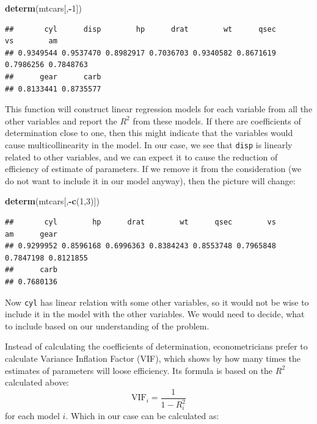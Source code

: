 \documentclass[
]{book}
\newenvironment{Shaded}{\begin{snugshade}}{\end{snugshade}}
\newcommand{\DecValTok}[1]{\textcolor[rgb]{0.00,0.00,0.81}{#1}}
\newcommand{\FunctionTok}[1]{\textcolor[rgb]{0.13,0.29,0.53}{\textbf{#1}}}
\newcommand{\NormalTok}[1]{#1}
\newcommand{\SpecialCharTok}[1]{\textcolor[rgb]{0.81,0.36,0.00}{\textbf{#1}}}
\theoremstyle{definition}
\theoremstyle{definition}
\theoremstyle{definition}
\theoremstyle{definition}
\theoremstyle{remark}
\begin{document}
\begin{Shaded}
\begin{Highlighting}[]
\FunctionTok{determ}\NormalTok{(mtcars[,}\SpecialCharTok{{-}}\DecValTok{1}\NormalTok{])}
\end{Highlighting}
\end{Shaded}

\begin{verbatim}
##       cyl      disp        hp      drat        wt      qsec        vs        am 
## 0.9349544 0.9537470 0.8982917 0.7036703 0.9340582 0.8671619 0.7986256 0.7848763 
##      gear      carb 
## 0.8133441 0.8735577
\end{verbatim}

This function will construct linear regression models for each variable from all the other variables and report the \(R^2\) from these models. If there are coefficients of determination close to one, then this might indicate that the variables would cause multicollinearity in the model. In our case, we see that \texttt{disp} is linearly related to other variables, and we can expect it to cause the reduction of efficiency of estimate of parameters. If we remove it from the consideration (we do not want to include it in our model anyway), then the picture will change:

\begin{Shaded}
\begin{Highlighting}[]
\FunctionTok{determ}\NormalTok{(mtcars[,}\SpecialCharTok{{-}}\FunctionTok{c}\NormalTok{(}\DecValTok{1}\NormalTok{,}\DecValTok{3}\NormalTok{)])}
\end{Highlighting}
\end{Shaded}

\begin{verbatim}
##       cyl        hp      drat        wt      qsec        vs        am      gear 
## 0.9299952 0.8596168 0.6996363 0.8384243 0.8553748 0.7965848 0.7847198 0.8121855 
##      carb 
## 0.7680136
\end{verbatim}

Now \texttt{cyl} has linear relation with some other variables, so it would not be wise to include it in the model with the other variables. We would need to decide, what to include based on our understanding of the problem.

Instead of calculating the coefficients of determination, econometricians prefer to calculate Variance Inflation Factor (VIF), which shows by how many times the estimates of parameters will loose efficiency. Its formula is based on the \(R^2\) calculated above:
\begin{equation*}
  \mathrm{VIF}_i = \frac{1}{1-R_i^2}
\end{equation*}
for each model \(i\). Which in our case can be calculated as:
\end{document}
